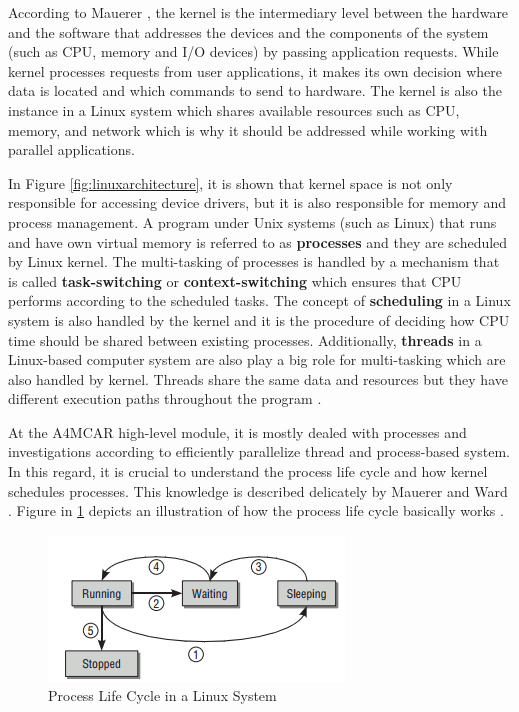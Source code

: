 According to Mauerer \cite{linuxkernelbook}, the kernel is the intermediary level between the hardware and the software that addresses the devices and the components of the system (such as CPU, memory and I/O devices) by passing application requests. While kernel processes requests from user applications, it makes its own decision where data is located and which commands to send to hardware. The kernel is also the instance in a Linux system which shares available resources such as CPU, memory, and network which is why it should be addressed while working with parallel applications.

In Figure \ref{fig:linuxarchitecture}, it is shown that kernel space is not only responsible for accessing device drivers, but it is also responsible for memory and process management. A program under Unix systems (such as Linux) that runs and have own virtual memory is referred to as \textbf{processes} and they are scheduled by Linux kernel. The multi-tasking of processes is handled by a mechanism that is called \textbf{task-switching} or \textbf{context-switching} which ensures that CPU performs according to the scheduled tasks. The concept of \textbf{scheduling} in a Linux system is also handled by the kernel and it is the procedure of deciding how CPU time should be shared between existing processes. Additionally, \textbf{threads} in a Linux-based computer system are also play a big role for multi-tasking which are also handled by kernel. Threads share the same data and resources but they have different execution paths throughout the program \cite{linuxkernelbook}.

At the A4MCAR high-level module, it is mostly dealed with processes and investigations according to efficiently parallelize thread and process-based system. In this regard, it is crucial to understand the process life cycle and how kernel schedules processes. This knowledge is described delicately by Mauerer \cite{linuxkernelbook} and Ward \cite{howlinuxworksbook}. Figure in \ref{fig:processlifecycle} depicts an illustration of how the process life cycle basically works \cite{linuxkernelbook}.
\begin{figure}[!ht]
	\centering
	\captionsetup{justification=centering}
	\includegraphics[scale=1]{content/images/processlifecycle.png}
	\caption{Process Life Cycle in a Linux System \cite{linuxkernelbook}}
	\label{fig:processlifecycle}
\end{figure}

